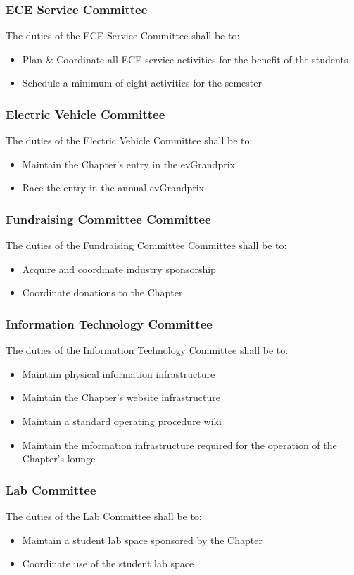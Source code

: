 \documentclass[10pt, oneside]{article}
\begin{document}
\subsubsection{ECE Service Committee}
The duties of the ECE Service Committee shall be to:
\begin{itemize}
\item Plan \& Coordinate all ECE service activities for the benefit of the students
\item Schedule a minimum of eight activities for the semester
\end{itemize}
\subsubsection{Electric Vehicle Committee}
The duties of the Electric Vehicle Committee shall be to:
\begin{itemize}
\item Maintain the Chapter’s entry in the evGrandprix
\item Race the entry in the annual evGrandprix
\end{itemize}
\subsubsection{Fundraising Committee Committee}
The duties of the Fundraising Committee Committee shall be to:
\begin{itemize}
\item Acquire and coordinate industry sponsorship
\item Coordinate donations to the Chapter
\end{itemize}
\subsubsection{Information Technology Committee}
The duties of the Information Technology Committee shall be to:
\begin{itemize}
\item Maintain physical information infrastructure
\item Maintain the Chapter’s website infrastructure
\item Maintain a standard operating procedure wiki
\item Maintain the information infrastructure required for the operation of the
Chapter’s lounge
\end{itemize}
\subsubsection{Lab Committee}
The duties of the Lab Committee shall be to:
\begin{itemize}
\item Maintain a student lab space sponsored by the Chapter
\item Coordinate use of the student lab space
\end{itemize}
\end{document}
